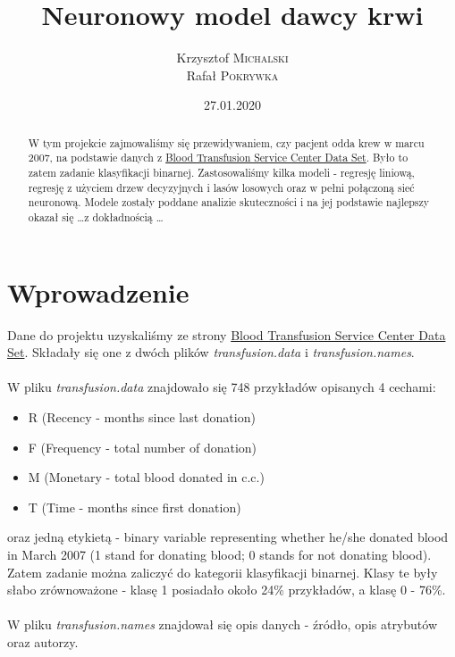 \documentclass[11pt, a4paper, notitlepage]{report}
\author{Krzysztof \textsc{Michalski} \\ Rafał \textsc{Pokrywka} }
\title{\textbf{Neuronowy model dawcy krwi}}
\date{27.01.2020}
\begin{document}
\clearpage\maketitle
\thispagestyle{empty}
\begin{abstract}
	W tym projekcie zajmowaliśmy się przewidywaniem, czy pacjent odda krew w marcu 2007, na podstawie danych z \href{https://archive.ics.uci.edu/ml/datasets/Blood+Transfusion+Service+Center/}{Blood Transfusion Service Center Data Set}. 
	Było to zatem zadanie klasyfikacji binarnej. Zastosowaliśmy kilka modeli - regresję liniową, regresję z użyciem drzew decyzyjnych i lasów losowych oraz w pełni połączoną sieć neuronową. Modele zostały poddane analizie skuteczności i na jej podstawie
	najlepszy okazał się \ldots z dokładnością \ldots 
\end{abstract}

\clearpage \tableofcontents
\thispagestyle{empty}

\setcounter{page}{1}

\chapter{Wprowadzenie}
	Dane do projektu uzyskaliśmy ze strony \href{https://archive.ics.uci.edu/ml/datasets/Blood+Transfusion+Service+Center/}{Blood Transfusion Service Center Data Set}. Składały się one z dwóch plików {\it transfusion.data} i {\it transfusion.names}.\\ \\
	W pliku  {\it transfusion.data} znajdowało się 748 przykładów opisanych 4 cechami:
	\begin{itemize}
	  \item R (Recency - months since last donation)
	  \item F (Frequency - total number of donation)
	  \item M (Monetary - total blood donated in c.c.)
	 \item T (Time - months since first donation)
	\end{itemize} oraz jedną etykietą - binary variable representing whether he/she donated blood in March 2007 (1 stand for donating blood; 0 stands for not donating blood). Zatem zadanie można zaliczyć do kategorii klasyfikacji binarnej. Klasy te były słabo zrównoważone - klasę 1
	posiadało około 24\% przykładów, a klasę 0 - 76\%.\\ \\
	W pliku {\it transfusion.names} znajdował się opis danych - źródło, opis atrybutów oraz autorzy.
\end{document}
